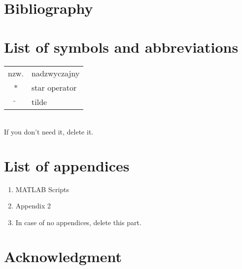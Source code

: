 \chapter{Bibliography}


\printbibliography[type=article,heading=subbibliography,title={Literature}]
\printbibliography[type=online,heading=subbibliography,title={Online}]

\chapter*{List of symbols and abbreviations}


\begin{tabular}{cl}
	nzw. & nadzwyczajny \\
	* & star operator \\
	$\widetilde{}$ & tilde 
\end{tabular}
\\
If you don't need it, delete it.
\thispagestyle{empty}

\chapter*{List of appendices}


\begin{enumerate}
	\item MATLAB Scripts
	\item Appendix 2
	\item In case of no appendices, delete this part.
\end{enumerate}
\thispagestyle{empty}

\chapter*{Acknowledgment}

